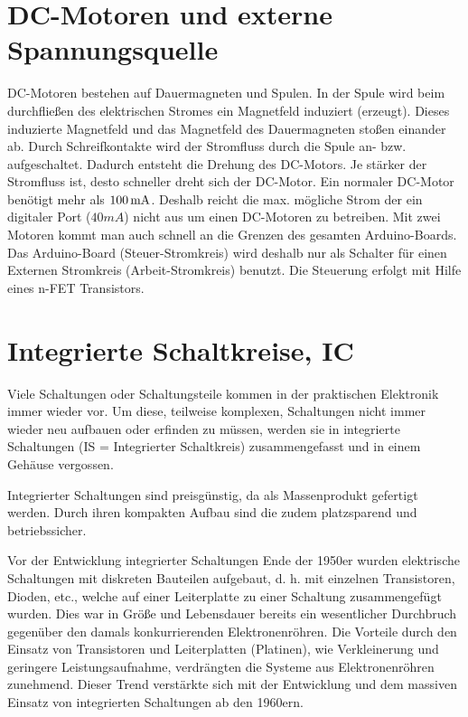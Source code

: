 \clearpage
{}

\clearpage
\section{DC-Motoren und externe Spannungsquelle}

DC-Motoren bestehen auf Dauermagneten und Spulen. In der Spule wird beim durchfließen des elektrischen Stromes ein Magnetfeld induziert (erzeugt). Dieses induzierte Magnetfeld und das Magnetfeld des Dauermagneten stoßen einander ab. Durch Schreifkontakte wird der Stromfluss durch die Spule an- bzw. aufgeschaltet. Dadurch entsteht  die Drehung des DC-Motors. Je stärker der Stromfluss ist, desto schneller dreht sich der DC-Motor. Ein normaler DC-Motor benötigt mehr als $100\operatorname{mA}$. Deshalb reicht die max. mögliche Strom der ein digitaler Port ($40mA$) nicht aus um einen DC-Motoren zu betreiben. Mit zwei Motoren kommt man auch schnell an die Grenzen des gesamten Arduino-Boards. Das Arduino-Board (Steuer-Stromkreis) wird deshalb nur als Schalter für einen Externen Stromkreis (Arbeit-Stromkreis) benutzt. Die Steuerung erfolgt mit Hilfe eines n-FET Transistors.   

\clearpage
\section{Integrierte Schaltkreise, IC}
Viele Schaltungen oder Schaltungsteile kommen in der praktischen Elektronik immer wieder vor. Um 
diese, teilweise komplexen, Schaltungen nicht immer wieder neu aufbauen oder erfinden zu müssen, 
werden sie in integrierte Schaltungen (IS = Integrierter Schaltkreis) zusammengefasst und in einem 
Gehäuse vergossen.

Integrierter Schaltungen sind preisgünstig, da als Massenprodukt gefertigt werden. Durch ihren
kompakten  Aufbau sind die zudem platzsparend und betriebssicher.
 
Vor der Entwicklung integrierter Schaltungen Ende der 1950er wurden elektrische Schaltungen mit 
diskreten Bauteilen aufgebaut, d. h. mit einzelnen Transistoren, Dioden, etc., welche auf einer 
Leiterplatte zu einer Schaltung zusammengefügt wurden. Dies war in Größe und Lebensdauer 
bereits ein wesentlicher Durchbruch gegenüber den damals konkurrierenden Elektronenröhren. 
Die Vorteile durch den Einsatz von Transistoren und Leiterplatten (Platinen), wie Verkleinerung 
und geringere Leistungsaufnahme, verdrängten die Systeme aus Elektronenröhren zunehmend. 
Dieser Trend verstärkte sich mit der Entwicklung und dem massiven Einsatz von integrierten 
Schaltungen ab den 1960ern.

